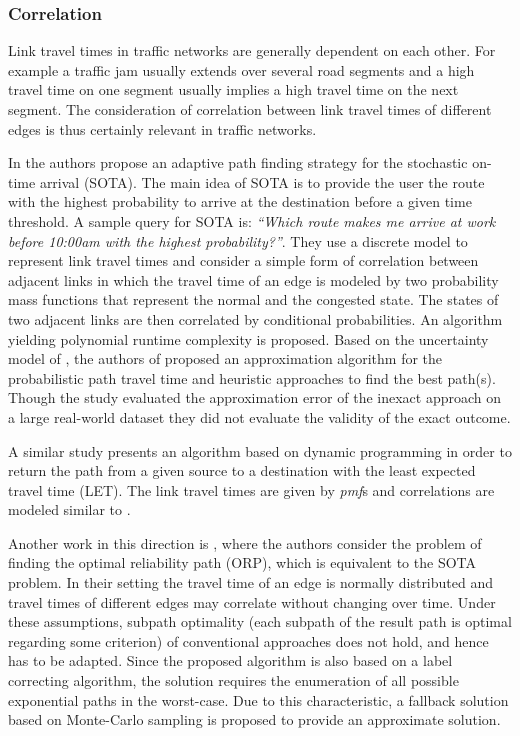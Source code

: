 \subsubsection{Correlation}
Link travel times in traffic networks are generally dependent on each
other. For example a traffic jam usually extends over several road segments
and a high travel time on one segment usually implies a high travel time on the
next segment. The consideration of correlation between link travel times of
different edges is thus certainly relevant in traffic networks.

In \cite{NieFan06} the authors propose an adaptive path finding strategy for the
stochastic on-time arrival (SOTA). The main idea of SOTA is to provide
the user the route with the highest probability to arrive at the
destination before a given time threshold. A sample query for SOTA is:
\textit{``Which route makes me arrive at work before 10:00am with the highest
probability?''}. They use a discrete model to represent link travel times and consider a simple form of
correlation between adjacent links in which the travel time of an edge is
modeled by two probability mass functions that represent the normal and the
congested state. The states of two adjacent links are then correlated by
conditional probabilities. An algorithm yielding polynomial runtime complexity
is proposed.
Based on the uncertainty model of \cite{NieFan06}, the authors of
\cite{HuaPei10} proposed an approximation algorithm for the probabilistic path
travel time and heuristic approaches to find the best path(s). Though the study
evaluated the approximation error of the inexact approach on a large
real-world dataset they did not evaluate the validity of the exact outcome.

 A similar study \cite{FanKalMoo05} presents an
algorithm based on dynamic programming in order to return the path from a given source to a destination
with the least expected travel time (LET). The link travel times are given by
\textit{pmf}s and correlations are modeled similar to \cite{NieFan06}.

Another work in this direction is \cite{SesSri10}, where the authors consider
the problem of finding the optimal reliability path (ORP), which is equivalent
to the SOTA problem. In their setting the travel time of an edge is normally
distributed and travel times of different edges may correlate without changing
over time. Under these assumptions, subpath optimality (each subpath of the
result path is optimal regarding some criterion) of conventional approaches
does not hold, and hence has to be adapted. Since the proposed algorithm is
also based on a label correcting algorithm, the solution requires the
enumeration of all possible exponential paths in the worst-case. Due to this
characteristic, a fallback solution based on Monte-Carlo sampling is proposed to provide an
approximate solution.

